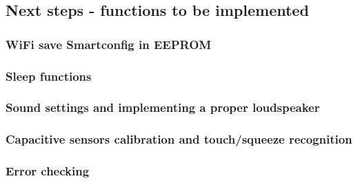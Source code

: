 


\subsection{Next steps - functions to be implemented}
    \subsubsection{WiFi save Smartconfig in EEPROM}
    \subsubsection{Sleep functions}
    \subsubsection{Sound settings and implementing a proper loudspeaker}
    \subsubsection{Capacitive sensors calibration and touch/squeeze recognition}
    \subsubsection{Error checking}
    
    
    
